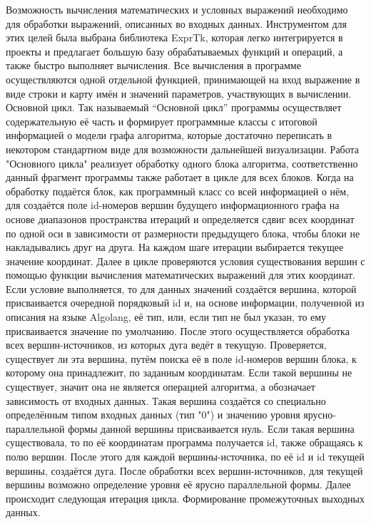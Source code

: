 Возможность вычисления математических и условных выражений необходимо для обработки выражений, описанных во входных данных. Инструментом для этих целей была выбрана библиотека ExprTk, которая легко интегрируется в проекты и предлагает большую базу обрабатываемых функций и операций, а также быстро выполняет вычисления. Все вычисления в программе осуществляются одной отдельной функцией, принимающей на вход выражение в виде строки и карту имён и значений параметров, участвующих в вычислении.
Основной цикл.
Так называемый “Основной цикл” программы осуществляет содержательную её часть и формирует программные классы с итоговой информацией о модели графа алгоритма, которые достаточно переписать в некотором стандартном виде для возможности дальнейшей визуализации.
Работа "Основного цикла" реализует обработку одного блока алгоритма, соответственно данный фрагмент программы также работает в цикле для всех блоков. Когда на обработку подаётся блок, как программный класс со всей информацией о нём, для создаётся поле id-номеров вершин будущего информационного графа на основе диапазонов пространства итераций и определяется сдвиг всех координат по одной оси в зависимости от размерности предыдущего блока, чтобы блоки не накладывались друг на друга. На каждом шаге итерации выбирается текущее значение координат. Далее в цикле проверяются условия существования вершин с помощью функции вычисления математических выражений для этих координат. Если условие выполняется, то для данных значений создаётся вершина, которой присваивается очередной порядковый id и, на основе информации, полученной из описания на языке Algolang, её тип, или, если тип не был указан, то ему присваивается значение по умолчанию. После этого осуществляется обработка всех вершин-источников, из которых дуга ведёт в текущую. Проверяется, существует ли эта вершина, путём поиска её в поле id-номеров вершин блока, к которому она принадлежит, по заданным координатам. Если такой вершины не существует, значит она не является операцией алгоритма, а обозначает зависимость от входных данных. Такая вершина создаётся со специально определённым типом входных данных (тип "0") и значению уровня ярусно-параллельной формы данной вершины присваивается нуль. Если такая вершина существовала, то по её координатам программа получается id, также обращаясь к полю вершин. После этого для каждой вершины-источника, по её id и id текущей вершины, создаётся дуга. После обработки всех вершин-источников, для текущей вершины возможно определение уровня её ярусно параллельной формы. Далее происходит следующая итерация цикла.
Формирование промежуточных выходных данных.
